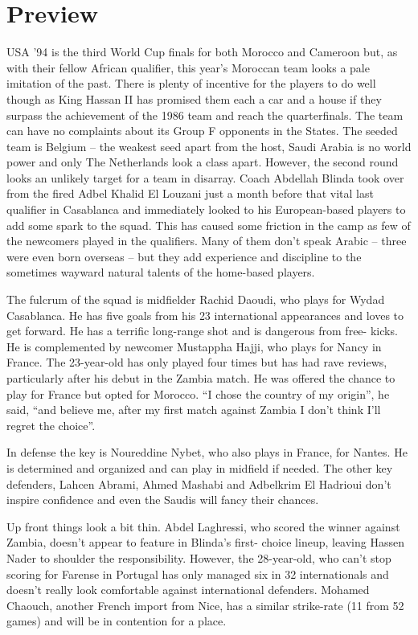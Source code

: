 \section{Preview}
USA '94 is the third World Cup finals for both Morocco and Cameroon but, as 
with their fellow African qualifier, this year's Moroccan team looks a pale 
imitation of the past. There is plenty of incentive for the players to do well
though as King Hassan II has promised them each a car and a house if they 
surpass the achievement of the 1986 team and reach the quarterfinals. The team
can have no complaints about its Group F opponents in the States. The seeded 
team is Belgium -- the weakest seed apart from the host, Saudi Arabia is no 
world power and only The Netherlands look a class apart. However, the second 
round looks an unlikely target for a team in disarray. Coach Abdellah Blinda 
took over from the fired Adbel Khalid El Louzani just a month before that vital 
last qualifier in Casablanca and immediately looked to his European-based 
players to add some spark to the squad. This has caused some friction in the 
camp as few of the newcomers played in the qualifiers. Many of them don't speak 
Arabic -- three were even born overseas -- but they add experience and 
discipline to the sometimes wayward natural talents of the home-based players.

The fulcrum of the squad is midfielder Rachid Daoudi, who plays for Wydad
Casablanca. He has five goals from his 23 international appearances and loves
to get forward. He has a terrific long-range shot and is dangerous from free-
kicks. He is complemented by newcomer Mustappha Hajji, who plays for Nancy in
France. The 23-year-old has only played four times but has had rave reviews,
particularly after his debut in the Zambia match. He was offered the chance to 
play for France but opted for Morocco. ``I chose the country of my origin'', he 
said, ``and believe me, after my first match against Zambia I don't think I'll 
regret the choice''.

In defense the key is Noureddine Nybet, who also plays in France, for Nantes.
He is determined and organized and can play in midfield if needed. The other 
key defenders, Lahcen Abrami, Ahmed Mashabi and Adbelkrim El Hadrioui don't 
inspire confidence and even the Saudis will fancy their chances.

Up front things look a bit thin. Abdel Laghressi, who scored the winner against 
Zambia, doesn't appear to feature in Blinda's first- choice lineup, leaving 
Hassen Nader to shoulder the responsibility. However, the 28-year-old, who 
can't stop scoring for Farense in Portugal has only managed six in 32 
internationals and doesn't really look comfortable against international 
defenders. Mohamed Chaouch, another French import from Nice, has a similar 
strike-rate (11 from 52 games) and will be in contention for a place.

